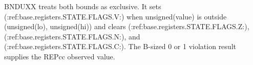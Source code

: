 BNDUXX treats both bounds as exclusive. It sets (:ref:base.registers.STATE.FLAGS.V:) when unsigned(value) is outside (unsigned(lo), unsigned(hi)) and clears (:ref:base.registers.STATE.FLAGS.Z:), (:ref:base.registers.STATE.FLAGS.N:), and (:ref:base.registers.STATE.FLAGS.C:). The B-sized 0 or 1 violation result supplies the REPcc observed value.
